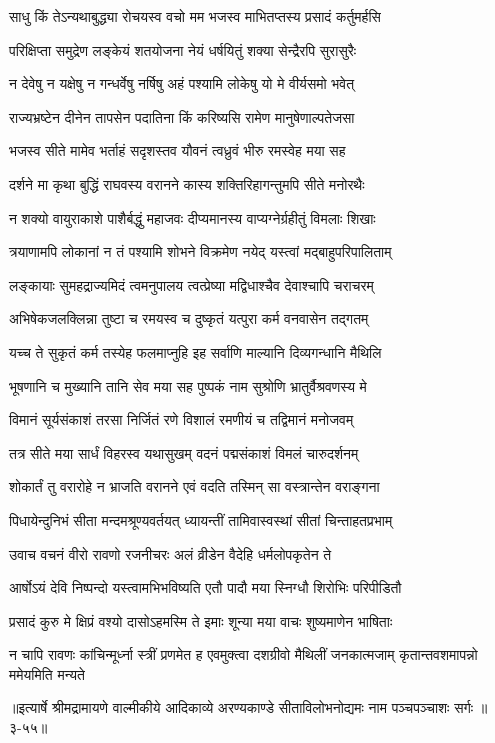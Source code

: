 \twolineshloka
{साधु किं तेऽन्यथाबुद्ध्या रोचयस्व वचो मम}
{भजस्व माभितप्तस्य प्रसादं कर्तुमर्हसि} %

\twolineshloka
{परिक्षिप्ता समुद्रेण लङ्केयं शतयोजना}
{नेयं धर्षयितुं शक्या सेन्द्रैरपि सुरासुरैः} %

\twolineshloka
{न देवेषु न यक्षेषु न गन्धर्वेषु नर्षिषु}
{अहं पश्यामि लोकेषु यो मे वीर्यसमो भवेत्} %

\twolineshloka
{राज्यभ्रष्टेन दीनेन तापसेन पदातिना}
{किं करिष्यसि रामेण मानुषेणाल्पतेजसा} %

\twolineshloka
{भजस्व सीते मामेव भर्ताहं सदृशस्तव}
{यौवनं त्वध्रुवं भीरु रमस्वेह मया सह} %

\twolineshloka
{दर्शने मा कृथा बुद्धिं राघवस्य वरानने}
{कास्य शक्तिरिहागन्तुमपि सीते मनोरथैः} %

\twolineshloka
{न शक्यो वायुराकाशे पाशैर्बद्धुं महाजवः}
{दीप्यमानस्य वाप्यग्नेर्ग्रहीतुं विमलाः शिखाः} %

\twolineshloka
{त्रयाणामपि लोकानां न तं पश्यामि शोभने}
{विक्रमेण नयेद् यस्त्वां मद्बाहुपरिपालिताम्} %

\twolineshloka
{लङ्कायाः सुमहद्राज्यमिदं त्वमनुपालय}
{त्वत्प्रेष्या मद्विधाश्चैव देवाश्चापि चराचरम्} %

\twolineshloka
{अभिषेकजलक्लिन्ना तुष्टा च रमयस्व च}
{दुष्कृतं यत्पुरा कर्म वनवासेन तद्गतम्} %

\twolineshloka
{यच्च ते सुकृतं कर्म तस्येह फलमाप्नुहि}
{इह सर्वाणि माल्यानि दिव्यगन्धानि मैथिलि} %

\twolineshloka
{भूषणानि च मुख्यानि तानि सेव मया सह}
{पुष्पकं नाम सुश्रोणि भ्रातुर्वैश्रवणस्य मे} %

\twolineshloka
{विमानं सूर्यसंकाशं तरसा निर्जितं रणे}
{विशालं रमणीयं च तद्विमानं मनोजवम्} %

\twolineshloka
{तत्र सीते मया सार्धं विहरस्व यथासुखम्}
{वदनं पद्मसंकाशं विमलं चारुदर्शनम्} %

\twolineshloka
{शोकार्तं तु वरारोहे न भ्राजति वरानने}
{एवं वदति तस्मिन् सा वस्त्रान्तेन वराङ्गना} %

\twolineshloka
{पिधायेन्दुनिभं सीता मन्दमश्रूण्यवर्तयत्}
{ध्यायन्तीं तामिवास्वस्थां सीतां चिन्ताहतप्रभाम्} %

\twolineshloka
{उवाच वचनं वीरो रावणो रजनीचरः}
{अलं व्रीडेन वैदेहि धर्मलोपकृतेन ते} %

\twolineshloka
{आर्षोऽयं देवि निष्पन्दो यस्त्वामभिभविष्यति}
{एतौ पादौ मया स्निग्धौ शिरोभिः परिपीडितौ} %

\twolineshloka
{प्रसादं कुरु मे क्षिप्रं वश्यो दासोऽहमस्मि ते}
{इमाः शून्या मया वाचः शुष्यमाणेन भाषिताः} %

\threelineshloka
{न चापि रावणः कांचिन्मूर्ध्ना स्त्रीं प्रणमेत ह}
{एवमुक्त्वा दशग्रीवो मैथिलीं जनकात्मजाम्}
{कृतान्तवशमापन्नो ममेयमिति मन्यते} %


॥इत्यार्षे श्रीमद्रामायणे वाल्मीकीये आदिकाव्ये अरण्यकाण्डे सीताविलोभनोद्यमः नाम पञ्चपञ्चाशः सर्गः ॥३-५५॥
